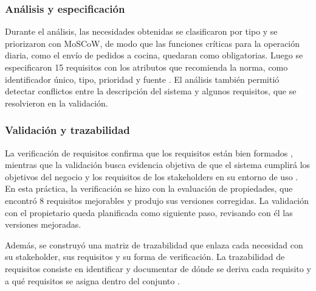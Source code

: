 \subsubsection{Análisis y especificación}

Durante el análisis, las necesidades obtenidas se clasificaron por tipo y se priorizaron con MoSCoW, de modo que las funciones críticas para la operación diaria, como el envío de pedidos a cocina, quedaran como obligatorias. Luego se especificaron 15 requisitos con los atributos que recomienda la norma, como identificador único, tipo, prioridad y fuente \cite[\nopp cl.~5.2.8.2]{ieee29148}. El análisis también permitió detectar conflictos entre la descripción del sistema y algunos requisitos, que se resolvieron en la validación.

\subsubsection{Validación y trazabilidad}

La verificación de requisitos confirma que los requisitos están bien formados \cite[\nopp cl.~3.1.26]{ieee29148}, mientras que la validación busca evidencia objetiva de que el sistema cumplirá los objetivos del negocio y los requisitos de los stakeholders en su entorno de uso \cite[\nopp cl.~6.5.3]{ieee29148}. En esta práctica, la verificación se hizo con la evaluación de propiedades, que encontró 8 requisitos mejorables y produjo sus versiones corregidas. La validación con el propietario queda planificada como siguiente paso, revisando con él las versiones mejoradas.

Además, se construyó una matriz de trazabilidad que enlaza cada necesidad con su stakeholder, sus requisitos y su forma de verificación. La trazabilidad de requisitos consiste en identificar y documentar de dónde se deriva cada requisito y a qué requisitos se asigna dentro del conjunto \cite[\nopp cl.~3.1.23]{ieee29148}.

